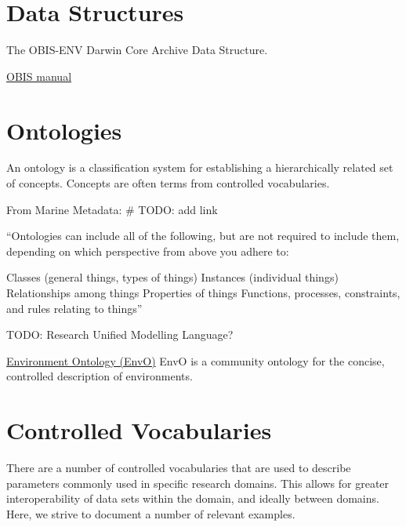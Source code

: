 \documentclass[
]{book}
\begin{document}
\hypertarget{data-structures}{%
\section{Data Structures}\label{data-structures}}

The OBIS-ENV Darwin Core Archive Data Structure.

\href{https://obis.org/manual/}{OBIS manual}

\hypertarget{ontologies}{%
\section{Ontologies}\label{ontologies}}

An ontology is a classification system for establishing a hierarchically related set of concepts. Concepts are often terms from controlled vocabularies.

From Marine Metadata: \# TODO: add link

``Ontologies can include all of the following, but are not required to include them, depending on which perspective from above you adhere to:

Classes (general things, types of things)
Instances (individual things)
Relationships among things
Properties of things
Functions, processes, constraints, and rules relating to things''

TODO: Research Unified Modelling Language?

\href{http://www.obofoundry.org/ontology/envo.html}{Environment Ontology (EnvO)} EnvO is a community ontology for the concise, controlled description of environments.

\hypertarget{controlled-vocabularies}{%
\section{Controlled Vocabularies}\label{controlled-vocabularies}}

There are a number of controlled vocabularies that are used to describe parameters commonly used in specific research domains. This allows for greater interoperability of data sets within the domain, and ideally between domains. Here, we strive to document a number of relevant examples.
\end{document}
